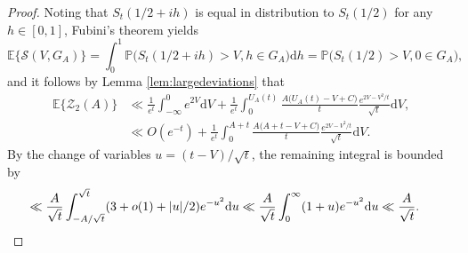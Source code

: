 \documentclass{amsart}
\theoremstyle{definition}
\theoremstyle{remark}
\numberwithin{equation}{section}
\begin{document}
\begin{proof}
Noting that $S_t(1/2+ih)$ is equal in distribution to $S_t(1/2)$ for any $h\in [0,1]$, Fubini's theorem yields
\[
    \mathbb{E}\big\{\mathcal{S}(V,G_A)\big\}=\int_0^1 \mathbb{P}\big(S_t(1/2+ih)>V, h\in G_A\big)\mathrm{d}h=\mathbb{P}\big(S_{t}(1/2)>V,0\in G_A\big), 
\]
and it follows by Lemma \ref{lem:largedeviations} that 
\begin{align*}
    \mathbb{E}\big\{\mathcal{Z}_2 (A)\big\}&\ll \frac{1}{e^t}\int_{-\infty}^0 e^{2V} \mathrm{d}V+\frac{1}{e^t}\int_{0}^{U_A(t)}\frac{A\big(U_A(t)- V+C\big)}{t}\frac{e^{2V-V^2/t}}{\sqrt{t}}\mathrm{d}V,\\
    &\ll O(e^{-t})+\frac{1}{e^t}\int_{0}^{A+t}\frac{A\big(A+t- V+C\big)}{t}\frac{e^{2V-V^2/t}}{\sqrt{t}}\mathrm{d}V.
\end{align*}
By the change of variables $u=({t}-V)/\sqrt{t}$, the remaining integral is bounded by
\begin{align*}
    \ll \frac{A}{\sqrt{t}}\int_{-A/\sqrt{t}}^{\sqrt{t}} (3+o(1)+|u|/2)e^{-u^2}\mathrm{d}u 
    &\ll \frac{A}{\sqrt{t}}\int_{0}^\infty (1+u)e^{-u^2}\mathrm{d}u \ll \frac{A}{\sqrt{t}}.\qedhere
\end{align*}
\end{proof}
\end{document}
